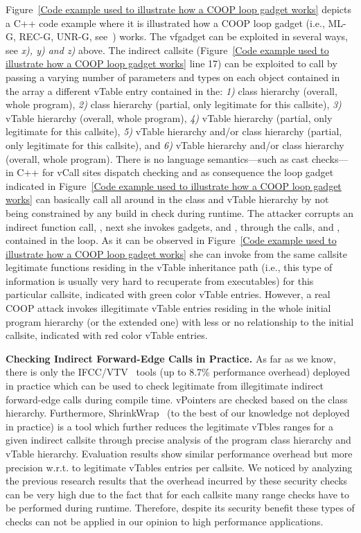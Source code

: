 Figure~\ref{Code example used to illustrate how a COOP loop gadget works}
depicts a C++ code example where it is illustrated how a COOP loop gadget 
(i.e., ML-G, REC-G, UNR-G, see~\cite{crane:readactor++}) works.
The vfgadget  can be exploited in several ways, see \textit{x), y) and z)} above.
The indirect callsite (Figure~\ref{Code example used to illustrate how a COOP loop gadget works} line 17) can be exploited 
to call by passing a varying number of parameters and types
on each object contained in the array a different
vTable entry contained in the:
\textit{1)} class hierarchy (overall, whole program),
\textit{2)} class hierarchy (partial, only legitimate for this callsite),
\textit{3)} vTable hierarchy (overall, whole program),
\textit{4)} vTable hierarchy (partial, only legitimate for this callsite),
\textit{5)} vTable hierarchy and/or class hierarchy (partial, only legitimate for this callsite), and
\textit{6)} vTable hierarchy and/or class hierarchy (overall, whole program).
There is no language semantics---such as cast checks---in C++ for vCall sites dispatch checking and as consequence
the loop gadget indicated in Figure~\ref{Code example used to illustrate how a COOP loop gadget works}
can basically call all around in the class and vTable hierarchy by not being constrained by any build in check during
runtime. The attacker corrupts an indirect function call, , 
next she invokes gadgets,   and , 
through the calls,  and , contained in the loop. 
As it can be observed in Figure~\ref{Code example used to illustrate how a COOP loop gadget works} she 
can invoke from the same callsite legitimate functions residing in the vTable inheritance path
(i.e., this type of information is usually very hard to recuperate from executables)
for this particular callsite, indicated with green color vTable entries. 
However, a real COOP attack invokes illegitimate
vTable entries residing in the whole initial program hierarchy (or the extended one)
with less or no relationship to the initial callsite,
indicated with red color vTable entries.

\textbf{Checking Indirect Forward-Edge Calls in Practice.}
\label{C++ Indirect Calls in Practice}
As far as we know, there is only the IFCC/VTV~\cite{vtv:tice} tools (up to 8.7\% performance overhead) deployed in practice
which can be used to check legitimate from illegitimate indirect forward-edge calls during compile time.
vPointers are checked based on the class hierarchy. Furthermore, ShrinkWrap~\cite{haller:shrinkwrap} (to the best of our knowledge not deployed in practice)
is a tool which further reduces the legitimate vTbles ranges for a given indirect callsite
through precise analysis of the program class hierarchy and vTable hierarchy. 
Evaluation results show similar performance overhead but more precision w.r.t. to legitimate vTables entries per callsite.
We noticed by analyzing the previous research results that the overhead incurred by
these security checks can be very high due to the fact that for each callsite many range checks 
have to be performed during runtime. Therefore, despite its security benefit these types of
checks can not be applied in our opinion to high performance applications.

